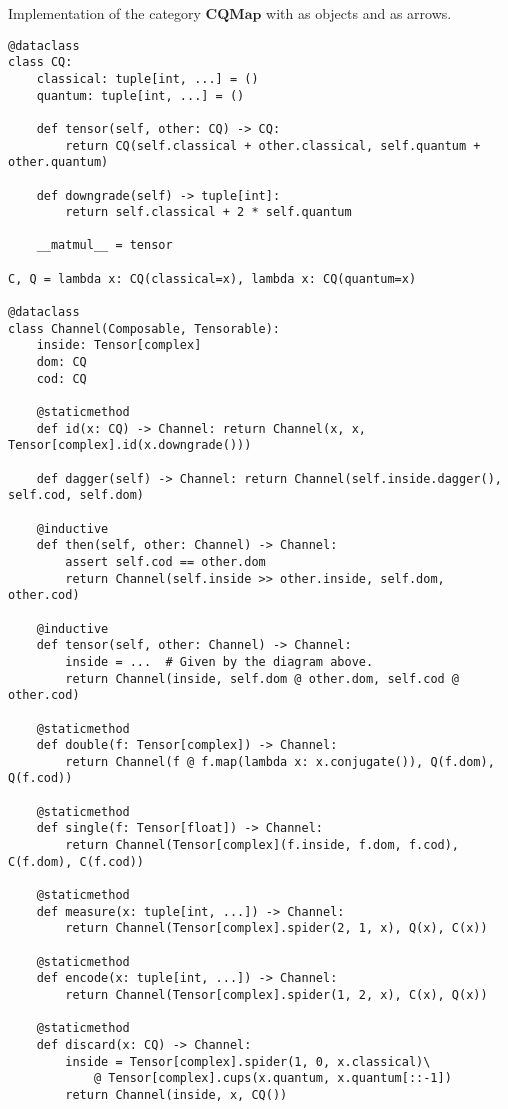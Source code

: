 \begin{python}
{\normalfont Implementation of the category $\mathbf{CQMap}$ with  as objects and  as arrows.}

\begin{verbatim}
@dataclass
class CQ:
    classical: tuple[int, ...] = ()
    quantum: tuple[int, ...] = ()

    def tensor(self, other: CQ) -> CQ:
        return CQ(self.classical + other.classical, self.quantum + other.quantum)

    def downgrade(self) -> tuple[int]:
        return self.classical + 2 * self.quantum

    __matmul__ = tensor

C, Q = lambda x: CQ(classical=x), lambda x: CQ(quantum=x)

@dataclass
class Channel(Composable, Tensorable):
    inside: Tensor[complex]
    dom: CQ
    cod: CQ

    @staticmethod
    def id(x: CQ) -> Channel: return Channel(x, x, Tensor[complex].id(x.downgrade()))

    def dagger(self) -> Channel: return Channel(self.inside.dagger(), self.cod, self.dom)

    @inductive
    def then(self, other: Channel) -> Channel:
        assert self.cod == other.dom
        return Channel(self.inside >> other.inside, self.dom, other.cod)

    @inductive
    def tensor(self, other: Channel) -> Channel:
        inside = ...  # Given by the diagram above.
        return Channel(inside, self.dom @ other.dom, self.cod @ other.cod)

    @staticmethod
    def double(f: Tensor[complex]) -> Channel:
        return Channel(f @ f.map(lambda x: x.conjugate()), Q(f.dom), Q(f.cod))

    @staticmethod
    def single(f: Tensor[float]) -> Channel:
        return Channel(Tensor[complex](f.inside, f.dom, f.cod), C(f.dom), C(f.cod))

    @staticmethod
    def measure(x: tuple[int, ...]) -> Channel:
        return Channel(Tensor[complex].spider(2, 1, x), Q(x), C(x))

    @staticmethod
    def encode(x: tuple[int, ...]) -> Channel:
        return Channel(Tensor[complex].spider(1, 2, x), C(x), Q(x))

    @staticmethod
    def discard(x: CQ) -> Channel:
        inside = Tensor[complex].spider(1, 0, x.classical)\
            @ Tensor[complex].cups(x.quantum, x.quantum[::-1])
        return Channel(inside, x, CQ())
\end{verbatim}
\end{python}

